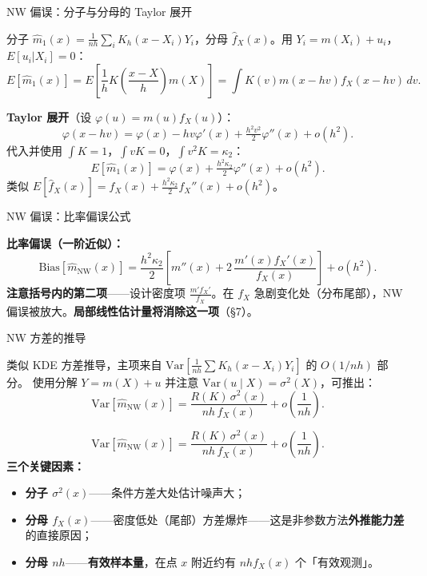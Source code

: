 \documentclass[aspectratio=169, 10pt]{beamer}
\begin{document}
\begin{frame}{NW 偏误：分子与分母的 Taylor 展开}

  分子 $\hat m_1(x) = \frac{1}{nh}\sum_i K_h(x-X_i) Y_i$，分母 $\hat f_X(x)$。用 $Y_i = m(X_i) + u_i$，$E[u_i|X_i]=0$：
  \[
    E[\hat m_1(x)] = E\!\left[\frac{1}{h}K\!\left(\frac{x-X}{h}\right) m(X)\right]
    = \int K(v) m(x-hv) f_X(x-hv)\, dv.
  \]

  \textbf{Taylor 展开}（设 $\varphi(u) = m(u)f_X(u)$）：
  \[
    \varphi(x-hv) = \varphi(x) - hv\varphi'(x) + \tfrac{h^2 v^2}{2}\varphi''(x) + o(h^2).
  \]
  代入并使用 $\int K = 1$，$\int vK = 0$，$\int v^2 K = \kappa_2$：
  \[
    E[\hat m_1(x)] = \varphi(x) + \tfrac{h^2 \kappa_2}{2}\varphi''(x) + o(h^2).
  \]
  类似 $E[\hat f_X(x)] = f_X(x) + \tfrac{h^2\kappa_2}{2}f_X''(x) + o(h^2)$。

\end{frame}


\begin{frame}{NW 偏误：比率偏误公式}

  \begin{highlightbox}
    \textbf{比率偏误（一阶近似）：}
    \[
      \boxed{\;\text{Bias}[\hat m_{\text{NW}}(x)]
      = \frac{h^2 \kappa_2}{2}\left[m''(x) + 2\,\frac{m'(x) f_X'(x)}{f_X(x)}\right] + o(h^2).\;}
    \]
    \textbf{注意括号内的第二项}——设计密度项 $\frac{m'f_X'}{f_X}$。在 $f_X$ 急剧变化处（分布尾部），NW 偏误被放大。\textbf{局部线性估计量将消除这一项}（\S7）。
  \end{highlightbox}
  \hypertarget{main-b4}{}\hfill{\scriptsize\hyperlink{proof-b4}{}}

\end{frame}


\begin{frame}{NW 方差的推导}

  类似 KDE 方差推导，主项来自 $\text{Var}\!\left[\frac{1}{nh}\sum K_h(x-X_i) Y_i\right]$ 的 $O(1/nh)$ 部分。
  使用分解 $Y = m(X) + u$ 并注意 $\text{Var}(u\mid X) = \sigma^2(X)$，可推出：
  \[
    \text{Var}[\hat m_{\text{NW}}(x)] = \frac{R(K)\, \sigma^2(x)}{nh\, f_X(x)} + o\!\left(\frac{1}{nh}\right).
  \]

  \begin{highlightbox}
    \[
      \boxed{\;\text{Var}[\hat m_{\text{NW}}(x)] = \frac{R(K)\, \sigma^2(x)}{nh\, f_X(x)} + o\!\left(\frac{1}{nh}\right).\;}
    \]
    \textbf{三个关键因素：}
    \begin{itemize}
      \item \textbf{分子 $\sigma^2(x)$}——条件方差大处估计噪声大；
      \item \textbf{分母 $f_X(x)$}——密度低处（尾部）方差爆炸——这是非参数方法\textbf{外推能力差}的直接原因；
      \item \textbf{分母 $nh$}——\textbf{有效样本量}，在点 $x$ 附近约有 $nh f_X(x)$ 个「有效观测」。
    \end{itemize}
  \end{highlightbox}

\end{frame}
\end{document}
